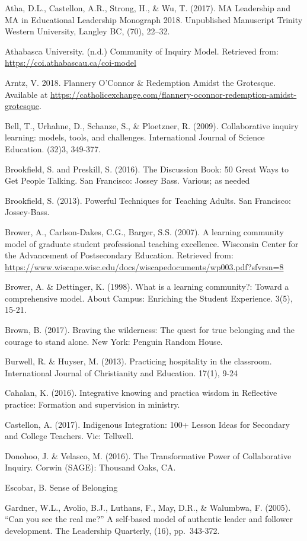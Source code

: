 \documentclass[
]{book}
\begin{document}
Atha, D.L., Castellon, A.R., Strong, H., \& Wu, T. (2017). MA Leadership and MA in Educational Leadership Monograph 2018. Unpublished Manuscript Trinity Western University, Langley BC, (70), 22--32.

Athabasca University. (n.d.) Community of Inquiry Model. Retrieved from: \url{https://coi.athabascau.ca/coi-model}

Arntz, V. 2018. Flannery O'Connor \& Redemption Amidst the Grotesque. Available at \url{https://catholicexchange.com/flannery-oconnor-redemption-amidst-grotesque}.

Bell, T., Urhahne, D., Schanze, S., \& Ploetzner, R. (2009). Collaborative inquiry learning: models, tools, and challenges. International Journal of Science Education. (32)3, 349-377.

Brookfield, S. and Preskill, S. (2016). The Discussion Book: 50 Great Ways to Get People Talking. San Francisco: Jossey Bass. Various; as needed

Brookfield, S. (2013). Powerful Techniques for Teaching Adults. San Francisco: Jossey-Bass.

Brower, A., Carlson-Dakes, C.G., Barger, S.S. (2007). A learning community model of graduate student professional teaching excellence. Wisconsin Center for the Advancement of Postsecondary Education. Retrieved from: \url{https://www.wiscape.wisc.edu/docs/wiscapedocuments/wp003.pdf?sfvrsn=8}

Brower, A. \& Dettinger, K. (1998). What is a learning community?: Toward a comprehensive model. About Campus: Enriching the Student Experience. 3(5), 15-21.

Brown, B. (2017). Braving the wilderness: The quest for true belonging and the courage to stand alone. New York: Penguin Random House.

Burwell, R. \& Huyser, M. (2013). Practicing hospitality in the classroom. International Journal of Christianity and Education. 17(1), 9-24

Cahalan, K. (2016). Integrative knowing and practica wisdom in Reflective practice: Formation and supervision in ministry.

Castellon, A. (2017). Indigenous Integration: 100+ Lesson Ideas for Secondary and College Teachers. Vic: Tellwell.

Donohoo, J. \& Velasco, M. (2016). The Transformative Power of Collaborative Inquiry. Corwin (SAGE): Thousand Oaks, CA.

Escobar, B. Sense of Belonging

Gardner, W.L., Avolio, B.J., Luthans, F., May, D.R., \& Walumbwa, F. (2005). ``Can you see the real me?'' A self-based model of authentic leader and follower development. The Leadership Quarterly, (16), pp.~343-372.
\end{document}
